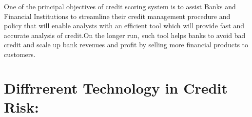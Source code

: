 {One of the principal objectives of credit scoring system is to assist Banks and Financial Institutions to streamline their credit management procedure and policy that will enable analysts with an efficient tool which will provide fast and accurate analysis of credit.On the longer run, such tool helps banks to avoid bad credit and scale up bank revenues and profit by selling more financial products to customers.\\

\section{Diffrrerent Technology in Credit Risk:}



}
